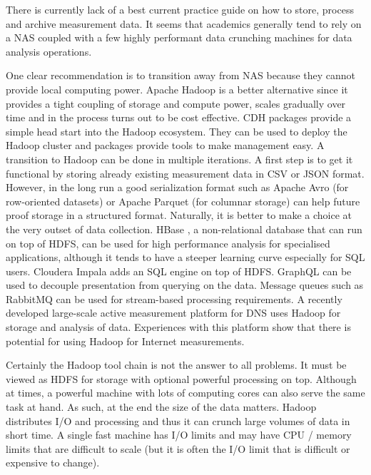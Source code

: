 There is currently lack of a best current practice guide on how to store,
process and archive measurement data. It seems that academics generally tend
to rely on a \ac{NAS} coupled with a few highly performant data crunching
machines for data analysis operations.

One clear recommendation is to transition away from \ac{NAS} because they
cannot provide local computing power. Apache Hadoop \cite{twhite:oreilly:2015}
is a better alternative since it provides a tight coupling of storage and
compute power, scales gradually over time and in the process turns out to be
cost effective.  \ac{CDH} packages \cite{twhite:oreilly:2015} provide a simple
head start into the Hadoop ecosystem.  They can be used to deploy the Hadoop
cluster and packages provide tools to make management easy.  A transition to
Hadoop can be done in multiple iterations. A first step is to get it
functional by storing already existing measurement data in CSV or JSON format.
However, in the long run a good serialization format such as Apache Avro
\cite{twhite:oreilly:2015} (for row-oriented datasets) or Apache Parquet
\cite{twhite:oreilly:2015} (for columnar storage) can help future proof
storage in a structured format. Naturally, it is better to make a choice at
the very outset of data collection. HBase \cite{twhite:oreilly:2015}, a
non-relational database that can run on top of \ac{HDFS}, can be used for high
performance analysis for specialised applications, although it tends to have a
steeper learning curve especially for SQL users.  Cloudera Impala adds an SQL
engine on top of \ac{HDFS}.  GraphQL can be used to decouple presentation from
querying on the data.  Message queues such as RabbitMQ can be used for
stream-based processing requirements. A recently developed large-scale active
measurement platform for DNS \cite{roland:sigcomm:2015} uses Hadoop for
storage and analysis of data.  Experiences with this platform show that there
is potential for using Hadoop for Internet measurements.

Certainly the Hadoop tool chain is not the answer to all problems. It must be
viewed as \ac{HDFS} for storage with optional powerful processing on top.
Although at times, a powerful machine with lots of computing cores can also
serve the same task at hand.  As such, at the end the size of the data
matters. Hadoop distributes I/O and processing and thus it can crunch large
volumes of data in short time. A single fast machine has I/O limits and may
have CPU / memory limits that are difficult to scale (but it is often the I/O
limit that is difficult or expensive to change).

